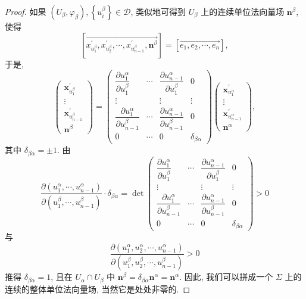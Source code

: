 \begin{proof}
如果 $\left(U_{\beta}, \varphi_{\beta}\right),\left\{u_{i}^{\beta}\right\} \in \mathcal{D}$, 类似地可得到 $U_{\beta}$ 上的连续单位法向量场 $\boldsymbol{n}^{\beta}$, 使得
\[
  \left[\overrightarrow{x_{u_{1}^{\beta}}^{\prime}, x_{u_{2}^{\beta}}^{\prime}, \cdots, x_{u_{n-1}^{\beta}}^{\prime}, \boldsymbol{n}^{\beta}}\right]=\left[\overrightarrow{e_{1}, e_{2}, \cdots, e_{n}}\right],
\]
于是,
\[
  \begin{pmatrix}
    \boldsymbol{x}_{u_{1}^{\beta}}^{\prime} \\
    \vdots \\
    \boldsymbol{x}_{u_{n-1}^{\beta}}^{\prime} \\
    \boldsymbol{n}^{\beta}
  \end{pmatrix}
  =\begin{pmatrix}
    \dfrac{\partial u_{1}^{\alpha}}{\partial u_{1}^{\beta}} & \cdots & \dfrac{\partial u_{n-1}^{\alpha}}{\partial u_{1}^{\beta}} & 0 \\
    \vdots & & \vdots & \vdots \\
    \dfrac{\partial u_{1}^{\alpha}}{\partial u_{n-1}^{\beta}} & \cdots & \dfrac{\partial u_{n-1}^{\alpha}}{\partial u_{n-1}^{\beta}} & 0 \\
    0 & \cdots & 0 & \delta_{\beta \alpha}
  \end{pmatrix}
  \begin{pmatrix}
    \boldsymbol{x}_{u_{1}^{\alpha}}^{\prime} \\
    \vdots \\
    \boldsymbol{x}_{u_{n-1}^{\alpha}}^{\prime} \\
    \boldsymbol{n}^{\alpha}
  \end{pmatrix},
\]
其中 $\delta_{\beta \alpha}=\pm 1$. 由
\[
  \frac{\partial\left(u_{1}^{\alpha}, \cdots, u_{n-1}^{\alpha}\right)}{\partial\left(u_{1}^{\beta}, \cdots, u_{n-1}^{\beta}\right)} \cdot \delta_{\beta \alpha}
  =\operatorname{det}
  \begin{pmatrix}
    \dfrac{\partial u_{1}^{\alpha}}{\partial u_{1}^{\beta}} & \cdots & \dfrac{\partial u_{n-1}^{\alpha}}{\partial u_{1}^{\beta}} & 0 \\
    \vdots & & \vdots & \vdots \\
    \dfrac{\partial u_{1}^{\alpha}}{\partial u_{n-1}^{\beta}} & \cdots & \dfrac{\partial u_{n-1}^{\alpha}}{\partial u_{n-1}^{\beta}} & 0 \\
    0 & \cdots & 0 & \delta_{\beta \alpha}
  \end{pmatrix}>0
\]
与
\[
  \frac{\partial\left(u_{1}^{\alpha}, u_{2}^{\alpha}, \cdots, u_{n-1}^{\alpha}\right)}{\partial\left(u_{1}^{\beta}, u_{2}^{\beta}, \cdots, u_{n-1}^{\beta}\right)}>0
\]
推得 $\delta_{\beta \alpha}=1$, 且在 $U_{\alpha} \cap U_{\beta}$ 中 $\boldsymbol{n}^{\beta}=\delta_{\beta \alpha} \boldsymbol{n}^{\alpha}=\boldsymbol{n}^{\alpha}$. 因此, 我们可以拼成一个 $\Sigma$ 上的连续的整体单位法向量场, 当然它是处处非零的.
\end{proof}

